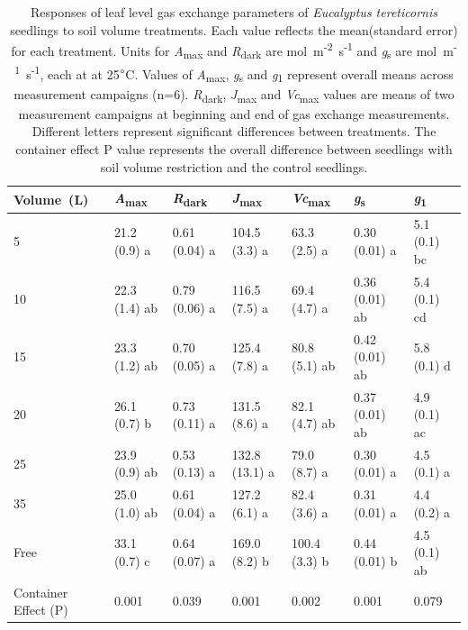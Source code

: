 \documentclass[a4paper]{article}\usepackage[]{graphicx}\usepackage[]{color}
\begin{document}

\begin{table}
\centering
\caption{Responses of leaf level gas exchange parameters of \textit{Eucalyptus tereticornis} seedlings to soil volume treatments. Each value reflects the mean(standard error) for each treatment. Units for \textit{A}\textsubscript{max} and \textit{R}\textsubscript{dark} are {\textmugreek}mol~m\textsuperscript{-2}~s\textsuperscript{-1} and \textit{g}\textsubscript{s} are mol~m\textsuperscript{-1}~s\textsuperscript{-1}, each at at 25$\degree$C. Values of \textit{A}\textsubscript{max}, \textit{g}\textsubscript{s} and \textit{g}\textsubscript{1} represent overall means across measurement campaigns (n=6). \textit{R}\textsubscript{dark}, \textit{J}\textsubscript{max} and \textit{Vc}\textsubscript{max} values are means of two measurement campaigns at beginning and end of gas exchange measurements. Different letters represent significant differences between treatments. The container effect P value represents the overall difference between seedlings with soil volume restriction and the control seedlings.} 
\label{table:Table2}
\begin{tabular}{lllllll}
  \hline
Volume~(L) & \textit{A}\textsubscript{max} & \textit{R}\textsubscript{dark} & \textit{J}\textsubscript{max} & \textit{Vc}\textsubscript{max} & \textit{g}\textsubscript{s} & \textit{g}\textsubscript{1} \\ 
  \hline
5 & 21.2 (0.9) a & 0.61 (0.04) a & 104.5 (3.3) a & 63.3 (2.5) a & 0.30 (0.01) a & 5.1 (0.1) bc \\ 
  10 & 22.3 (1.4) ab & 0.79 (0.06) a & 116.5 (7.5) a & 69.4 (4.7) a & 0.36 (0.01) ab & 5.4 (0.1) cd \\ 
  15 & 23.3 (1.2) ab & 0.70 (0.05) a & 125.4 (7.8) a & 80.8 (5.1) ab & 0.42 (0.01) ab & 5.8 (0.1) d \\ 
  20 & 26.1 (0.7) b & 0.73 (0.11) a & 131.5 (8.6) a & 82.1 (4.7) ab & 0.37 (0.01) ab & 4.9 (0.1) ac \\ 
  25 & 23.9 (0.9) ab & 0.53 (0.13) a & 132.8 (13.1) a & 79.0 (8.7) a & 0.30 (0.01) a & 4.5 (0.1) a \\ 
  35 & 25.0 (1.0) ab & 0.61 (0.04) a & 127.2 (6.1) a & 82.4 (3.6) a & 0.31 (0.01) a & 4.4 (0.2) a \\ 
  Free & 33.1 (0.7) c & 0.64 (0.07) a & 169.0 (8.2) b & 100.4 (3.3) b & 0.44 (0.01) b & 4.5 (0.1) ab \\ 
   \hline
Container Effect (P) & 0.001 & 0.039 & 0.001 & 0.002 & 0.001 & 0.079 \\ 
   \hline
\end{tabular}
\end{table}
\end{document}
